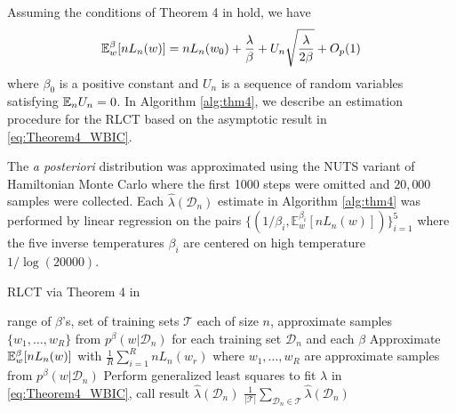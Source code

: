 \documentclass{article} %
\begin{document}
Assuming the conditions of Theorem 4 in \cite{watanabe_widely_2013} hold, we have
\begin{equation}
{\mathbb{E}}_w^\beta [nL_n(w)] = nL_n(w_0) + \frac{\lambda }{\beta} + U_n \sqrt{\frac{\lambda}{2 \beta}} + O_p(1)
\label{eq:Theorem4_WBIC}
\end{equation}
where $\beta_0$ is a positive constant and $U_n$ is a sequence of random variables satisfying ${\mathbb{E}}_n U_n = 0$. %
In Algorithm \ref{alg:thm4}, we describe an estimation procedure for the RLCT based on the asymptotic result in \eqref{eq:Theorem4_WBIC}.

The \emph{a posteriori} distribution was approximated using the NUTS variant of Hamiltonian Monte Carlo \citep{hoffman2014no} where the first 1000 steps were omitted and $20,000$ samples were collected.  Each $\hat \lambda(\mathcal D_n)$ estimate in Algorithm \ref{alg:thm4} was performed by linear regression on the pairs $\{ (1/\beta_i, \mathbb{E}^{\beta_i}_w[ nL_n(w) ] ) \}_{i=1}^5$ where the five inverse temperatures $\beta_i$ are centered on high temperature $1/\log(20000)$.

\begin{algorithm}[tb]
	\caption{RLCT via Theorem 4  in \cite{watanabe_widely_2013}}
	\label{alg:thm4}
	\begin{algorithmic}
		 range of $\beta$'s, set of training sets $\mathcal T$ each of size $n$, approximate samples $\{w_1,\ldots,w_R\}$ from $p^\beta(w|\mathcal D_n)$ for each training set $\mathcal D_n$ and each $\beta$
		\STATE Approximate ${\mathbb{E}}_w^\beta [nL_n(w)]$ with $\frac{1}{R} \sum_{i=1}^R nL_n(w_r)$ where $w_1,\ldots,w_R$ are approximate samples from $p^\beta(w|\mathcal D_n)$
		\ENDFOR
		\STATE Perform generalized least squares to fit $\lambda$ in \eqref{eq:Theorem4_WBIC}, call result $\hat \lambda(\mathcal D_n)$
		\ENDFOR
		 $\frac{1}{|\mathcal T|} \sum_{\mathcal D_n \in \mathcal T} \hat \lambda(\mathcal D_n)$
	\end{algorithmic}
\end{algorithm}
\end{document}
